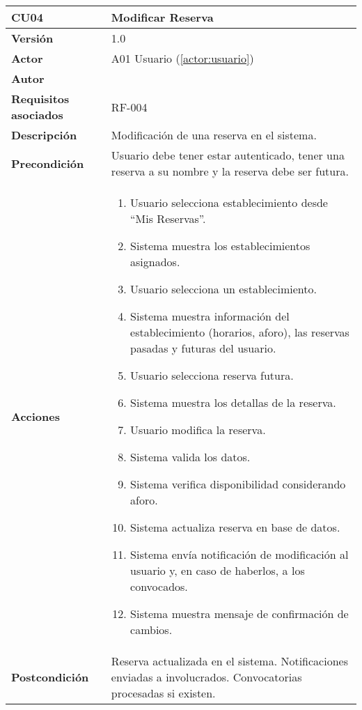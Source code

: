 \begin{table}[H]
	\centering
	\begin{tabularx}{\linewidth}{ p{} p{} }
		\toprule
		\textbf{CU04}    & \textbf{Modificar Reserva} \\
		\toprule
		\textbf{Versión}              & 1.0    \\
		\textbf{Actor}                & A01 Usuario (\ref{actor:usuario}) \\
		\textbf{Autor}                & \nombre \\
		\textbf{Requisitos asociados} & RF-004 \\
		\textbf{Descripción}          & Modificación de una reserva en el sistema. \\
		\textbf{Precondición}         & Usuario debe tener estar autenticado, tener una reserva a su nombre y la reserva debe ser futura. \\
		\textbf{Acciones}             &
		\begin{enumerate}
			\def\labelenumi{\arabic{enumi}.}
			\tightlist
			\item Usuario selecciona establecimiento desde ``Mis Reservas''.
            \item Sistema muestra los establecimientos asignados.
            \item Usuario selecciona un establecimiento.
            \item Sistema muestra información del establecimiento (horarios, aforo), las reservas pasadas y futuras del usuario.
            \item Usuario selecciona reserva futura.
            \item Sistema muestra los detallas de la reserva.
            \item Usuario modifica la reserva.
            \item Sistema valida los datos.
            \item Sistema verifica disponibilidad considerando aforo.
            \item Sistema actualiza reserva en base de datos.
            \item Sistema envía notificación de modificación al usuario y, en caso de haberlos, a los convocados.
            \item Sistema muestra mensaje de confirmación de cambios.
		\end{enumerate}\\
		\textbf{Postcondición}        & Reserva actualizada en el sistema. Notificaciones enviadas a involucrados. Convocatorias procesadas si existen.\\

\end{tabularx}
\end{table}
